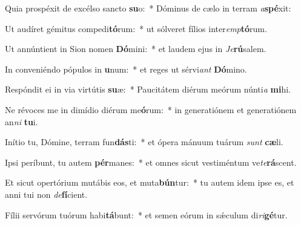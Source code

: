 \item Quia prospéxit de excélso sancto \textbf{su}o:~* Dóminus de cælo in terram \textit{a}\textbf{spé}xit:
\item Ut audíret gémitus compedi\textbf{tó}rum:~* ut sólveret fílios inter\textit{emp}\textbf{tó}rum.
\item Ut annúntient in Sion nomen \textbf{Dó}mini:~* et laudem ejus in \textit{Je}\textbf{rú}salem.
\item In conveniéndo pópulos in \textbf{u}num:~* et reges ut sérvi\textit{ant} \textbf{Dó}mino.
\item Respóndit ei in via virtútis \textbf{su}æ:~* Paucitátem diérum meórum núnti\textit{a} \textbf{mi}hi.
\item Ne révoces me in dimídio diérum me\textbf{ó}rum:~* in generatiónem et generatiónem an\textit{ni} \textbf{tu}i.
\item Inítio tu, Dómine, terram fun\textbf{dás}ti:~* et ópera mánuum tuárum \textit{sunt} \textbf{cæ}li.
\item Ipsi períbunt, tu autem \textbf{pér}manes:~* et omnes sicut vestiméntum ve\textit{te}\textbf{rá}scent.
\item Et sicut opertórium mutábis eos, et muta\textbf{bún}tur:~* tu autem idem ipse es, et anni tui non \textit{de}\textbf{fí}cient.
\item Fílii servórum tuórum habi\textbf{tá}bunt:~* et semen eórum in sǽculum di\textit{ri}\textbf{gé}tur.
